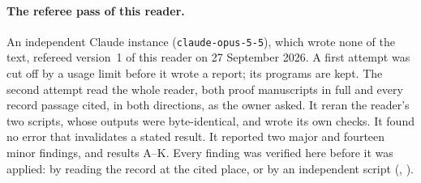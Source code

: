 \paragraph{The referee pass of this reader.}
An independent Claude instance (\texttt{claude-opus-5-5}), which wrote none of the text, refereed version~1 of this reader on 27 September 2026. A first attempt was cut off by a usage limit before it wrote a report; its programs are kept. The second attempt read the whole reader, both proof manuscripts in full and every record passage cited, in both directions, as the owner asked. It reran the reader's two scripts, whose outputs were byte-identical, and wrote its own checks. It found no error that invalidates a stated result. It reported two major and fourteen minor findings, and results A--K. Every finding was verified here before it was applied: by reading the record at the cited place, or by an independent script (, ).
